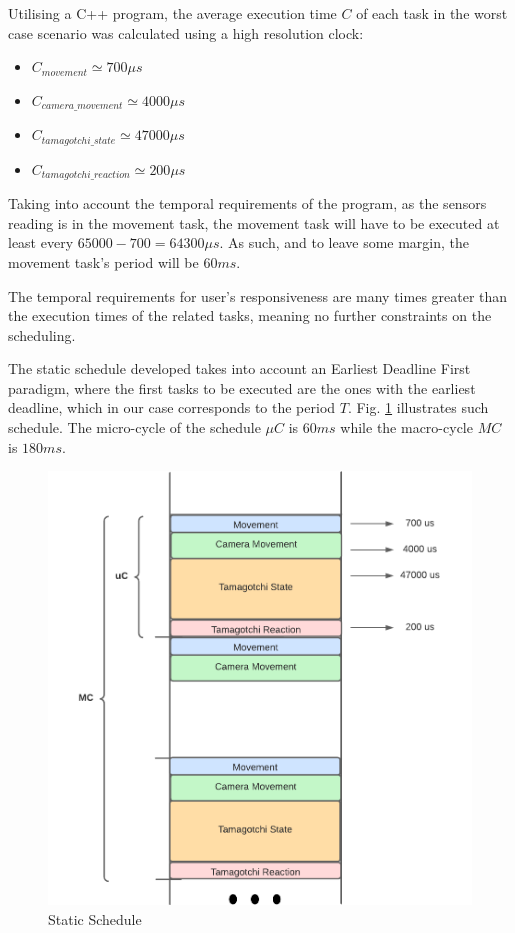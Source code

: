 \documentclass[conference]{IEEEtran}
\begin{document}
Utilising a C++ program, the average execution time $C$ of each task in the worst case scenario was calculated using a high resolution clock:

\begin{itemize}
    \item $C_{movement} \simeq 700 \mu s $
    \item $C_{camera\_movement} \simeq 4000 \mu s $
    \item $C_{tamagotchi\_state} \simeq 47000 \mu s $
    \item $C_{tamagotchi\_reaction} \simeq 200 \mu s $
\end{itemize}

Taking into account the temporal requirements of the program, as the sensors reading is in the movement task, the movement task will have to be executed at least every $65000 - 700 = 64300 \mu s$. As such, and to leave some margin, the movement task's period will be $60 ms$. 

The temporal requirements for user's responsiveness are many times greater than the execution times of the related tasks, meaning no further constraints on the scheduling.

The static schedule developed takes into account an Earliest Deadline First paradigm, where the first tasks to be executed are the ones with the earliest deadline, which in our case corresponds to the period $T$. Fig. \ref{fig:schedule} illustrates such schedule. The micro-cycle of the schedule $\mu C$ is $60 ms$ while the macro-cycle $MC$ is $180 ms$.


\begin{figure}
    \centering
    \includegraphics[width=\linewidth]{img/schedule.pdf}
    \caption{Static Schedule}
    \label{fig:schedule}
\end{figure}
\end{document}
